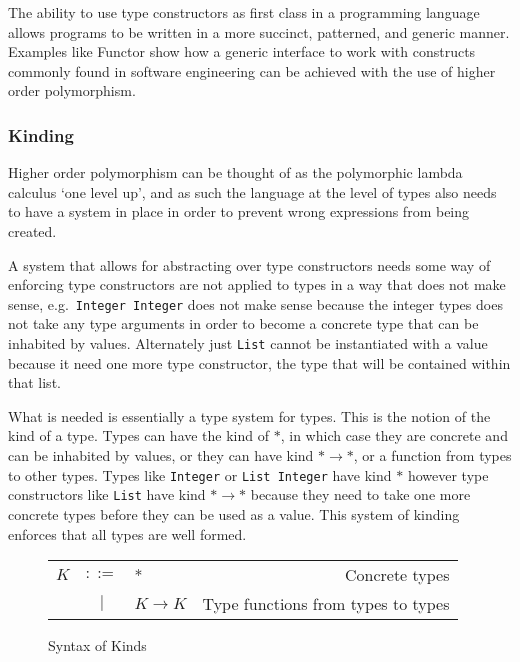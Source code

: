 The ability to use type constructors as first class in a programming language
allows programs to be written in a more succinct, patterned, and generic manner.
Examples like Functor show how a generic interface to work with constructs
commonly found in software engineering can be achieved with the use of higher
order polymorphism. 

\subsubsection{Kinding}

Higher order polymorphism can be thought of as the polymorphic lambda calculus
`one level up', and as such the language at the level of types also needs to 
have a system in place in order to prevent wrong expressions from being created.

A system that allows for abstracting over type constructors needs some way
of enforcing type constructors are not applied to types in a way that does not
make sense, e.g.\ \lstinline{Integer Integer} does not make sense because the
integer types does not take any type arguments in order to become a concrete
type that can be inhabited by values. Alternately just \lstinline{List} cannot
be instantiated with a value because it need one more type constructor, 
the type that will be contained within that list.

What is needed is essentially a type system for types. This is the notion of
the kind of a type. Types can have the kind of $ * $, in which case
they are concrete and can be inhabited by values, or they can have kind
$ * \rightarrow * $, or a function from types to other types. Types like
\lstinline{Integer} or \lstinline{List Integer} have kind $ * $ however
type constructors like \lstinline{List} have kind 
$ * \rightarrow * $ because they need to take one more concrete
types before they can be used as a value. This system of kinding enforces that
all types are well formed.

\begin{figure}[H]\label{fig:kinds}
    \centering
    \begin{tabular}{l c p{3cm} r}
        $ K $ & $ ::= $ & * &                   Concrete types \\
      & $ | $ & $ K \rightarrow K $ &           Type functions from types to types \\
    \end{tabular}
    \caption{Syntax of Kinds}
\end{figure}

